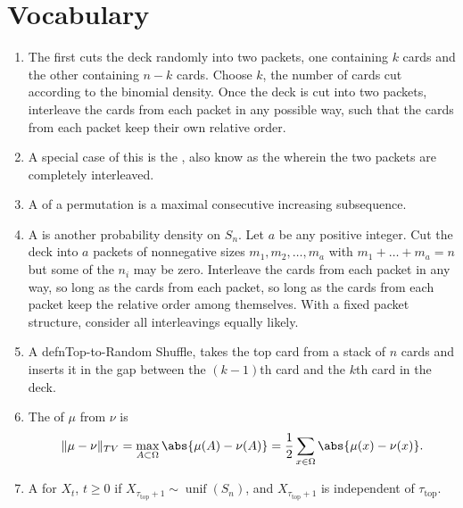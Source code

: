 \documentclass[12pt]{article}
\begin{document}
\section*{Vocabulary}
\begin{enumerate}
    \item
        The  first cuts the deck randomly into two
        packets, one containing \( k \) cards and the other containing \(
        n-k \) cards.  Choose \( k \), the number of cards cut according
        to the binomial density. Once the deck is cut into two packets,
        interleave the cards from each packet in any possible way, such
        that the cards from each packet keep their own relative order.
    \item
        A special case of this is the , also know
        as the  wherein the two packets are
        completely interleaved.
    \item
        A  of a permutation is a maximal
        consecutive increasing subsequence.
    \item
        A  is another probability density on \( S_n
        \).  Let \( a \) be any positive integer.  Cut the deck into \(
        a \) packets of nonnegative sizes \( m_1, m_2, \dots, m_a \)
        with \( m_1 + \dots + m_a = n \) but some of the \( n_i \) may
        be zero. Interleave the cards from each packet in any way, so
        long as the cards from each packet, so long as the cards from
        each packet keep the relative order among themselves.  With a
        fixed packet structure, consider all interleavings equally
        likely.
    \item
        A defn{Top-to-Random Shuffle},%
        takes the top card from a stack of \( n \) cards and inserts it
        in the gap between the \( (k-1) \)th card and the \( k \)th card
        in the deck.
    \item
        The  of \( \mu \) from \( \nu \)
        is%
        \[
            \| \mu - \nu \|_{TV} = \max_{A \subset \Omega} \abs{ \mu(A)
            - \nu(A)} = \frac{1}{2} \sum\limits_{x \in \Omega} \abs{ \mu
            (x) - \nu(x)}.
        \]
    \item
        A %
        for \( X_t \), \( t \ge 0 \) if \( X_{\tau_{\text{top}}+1} \sim
        \operatorname{unif}
        (S_n) \), and \( X_{\tau_{\text{top}}+1} \) is independent of \(
        \tau_{\text{top}} \).
\end{enumerate}
\end{document}
